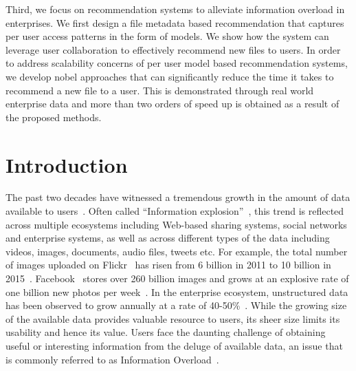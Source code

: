 \documentclass[12pt]{ucsddissertation}
\begin{document}
\begin{dissertationabstract}
Third, we focus on recommendation systems to alleviate information overload in enterprises. We first design a file metadata based recommendation that captures per user access patterns in the form of models. We show how the system can leverage user collaboration to effectively recommend new files to users. In order to address scalability concerns of per user model based recommendation systems, we develop nobel approaches that can significantly reduce the time it takes to recommend a new file to a user. This is demonstrated through real world enterprise data and more than two orders of speed up is obtained as a result of the proposed methods. 




\end{dissertationabstract}

\mainmatter


\chapter{Introduction} 
The past two decades have witnessed a tremendous growth in the amount of data available to users~\cite{edmunds2000problem,ShuhuiAuthor15,IDCDataGrowth,Neilson2011}. Often called ``Information explosion''~\cite{van2002information}, this trend is reflected across multiple ecosystems including Web-based sharing systems, social networks and enterprise systems, as well as across different types of the data including videos, images, documents, audio files, tweets etc. For example, the total number of images uploaded on Flickr~\cite{Flickr} has risen from 6 billion in 2011 to 10 billion in 2015~\cite{Flickr6B,Flickr10B}. Facebook~\cite{Facebook} stores over 260 billion images and grows at an explosive rate of one billion new photos per week~\cite{beaver2010finding}. In the enterprise ecosystem, unstructured data has been observed to grow annually at a rate of 40-50\%~\cite{IDCDataGrowth}. While the growing size of the available data provides valuable resource to users, its sheer size limits its usability and hence its value. Users face the daunting challenge of obtaining useful or interesting information from the deluge of available data, an issue that is commonly referred to as Information Overload~\cite{edmunds2000problem}.
\end{document}
